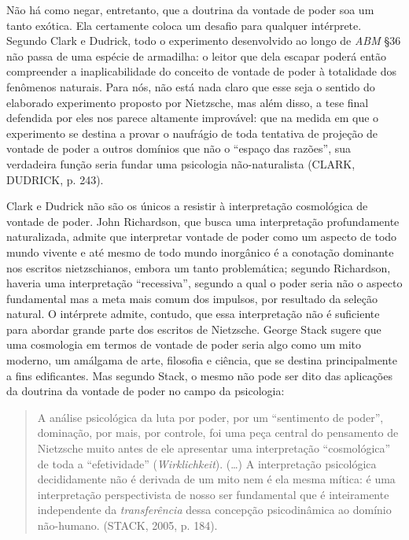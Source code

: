 \documentclass[
	12pt,				%
	openright,			%
	oneside,			%
	a4paper,			%
	english,			%
	french,				%
	spanish,			%
	brazil				%
	]{abntex2}
\begin{document}
	Não há como negar, entretanto, que a doutrina da vontade de poder soa um tanto exótica. Ela certamente coloca um desafio para qualquer intérprete. Segundo Clark e Dudrick, todo o experimento desenvolvido ao longo de \textit{ABM} §36 não passa de uma espécie de armadilha: o leitor que dela escapar poderá então compreender a inaplicabilidade do conceito de vontade de poder à totalidade dos fenômenos naturais. Para nós, não está nada claro que esse seja o sentido do elaborado experimento proposto por Nietzsche, mas além disso, a tese final defendida por eles nos parece altamente improvável: que na medida em que o experimento se destina a provar o naufrágio de toda tentativa de projeção de vontade de poder a outros domínios que não o “espaço das razões”, sua verdadeira função seria fundar uma psicologia não-naturalista (CLARK, DUDRICK, p. 243). 

Clark e Dudrick não são os únicos a resistir à interpretação cosmológica de vontade de poder. John Richardson, que busca uma interpretação profundamente naturalizada, admite que interpretar vontade de poder como um aspecto de todo mundo vivente e até mesmo de todo mundo inorgânico é a conotação dominante nos escritos nietzschianos, embora um tanto problemática; segundo Richardson, haveria uma interpretação “recessiva”, segundo a qual o poder seria não o aspecto fundamental mas a meta mais comum dos impulsos, por resultado da seleção natural. O intérprete admite, contudo, que essa interpretação não é suficiente para abordar grande parte dos escritos de Nietzsche. George Stack sugere que uma cosmologia em termos de vontade de poder seria algo como um mito moderno, um amálgama de arte, filosofia e ciência, que se destina principalmente a fins edificantes. Mas segundo Stack, o mesmo não pode ser dito das aplicações da doutrina da vontade de poder no campo da psicologia:

\begin{quotation}
A análise psicológica da luta por poder, por um “sentimento de poder”, dominação, por mais, por controle, foi uma peça central do pensamento de Nietzsche muito antes de ele apresentar uma interpretação “cosmológica” de toda a “efetividade” (\textit{Wirklichkeit}). (…) A interpretação psicológica decididamente não é derivada de um mito nem é ela mesma mítica: é uma interpretação perspectivista de nosso ser fundamental que é inteiramente independente da \textit{transferência} dessa concepção psicodinâmica ao domínio não-humano. (STACK, 2005, p. 184).
\end{quotation}
\end{document}
